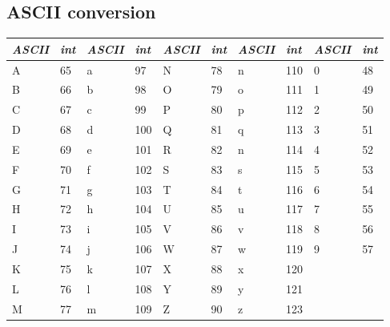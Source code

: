 \documentclass[5pt]{article}
\begin{document}
\begin{multicols}{2}
\section{ASCII conversion}
\begin{center}
\begin{tabular}{|ll|ll|ll|ll|ll|}
\hline
\tiny{\emph{ASCII}} &  \emph{int} & \tiny{\emph{ASCII}} &  \emph{int} &  \tiny{\emph{ASCII}} &  \emph{int} &  \tiny{\emph{ASCII}} &  \emph{int}&  \tiny{\emph{ASCII}} &  \emph{int}\\
 \hline
A & 65 & a & 97 & N & 78 & n & 110 & 0 & 48\\
B & 66 & b & 98 & O & 79 & o & 111 & 1 & 49\\
C & 67 & c & 99 & P & 80 & p & 112 & 2 & 50\\
D & 68 & d & 100 & Q & 81 & q & 113 & 3 & 51\\
E & 69 & e & 101 & R & 82 & n & 114 & 4 & 52\\
F & 70 & f & 102 & S & 83 & s & 115 & 5 & 53\\
G & 71 & g & 103 & T & 84 & t & 116 & 6 & 54\\
H & 72 & h & 104 & U & 85 & u & 117 & 7 & 55\\
I & 73 & i & 105 & V & 86 & v & 118 & 8 & 56\\
J & 74 & j & 106 & W & 87 & w & 119 & 9 & 57\\
K & 75 & k & 107 & X & 88 & x & 120 & &\\
L & 76 & l & 108 & Y & 89 & y & 121 & &\\
M & 77 & m & 109 & Z & 90 & z & 123 & &\\
\hline
\end{tabular}
\end{center}

\end{multicols}
\end{document}
